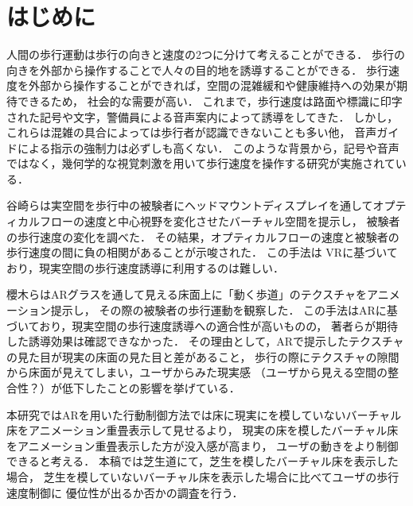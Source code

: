 \documentclass[dvipdfmx]{jsarticle}
\begin{document}

\vspace{3mm}

\section{はじめに}
人間の歩行運動は歩行の向きと速度の2つに分けて考えることができる．
歩行の向きを外部から操作することで人々の目的地を誘導することができる．
歩行速度を外部から操作することができれば，空間の混雑緩和や健康維持への効果が期待できるため，
社会的な需要が高い．
これまで，歩行速度は路面や標識に印字された記号や文字，警備員による音声案内によって誘導をしてきた．
しかし，これらは混雑の具合によっては歩行者が認識できないことも多い他，
音声ガイドによる指示の強制力は必ずしも高くない．
このような背景から，記号や音声ではなく，幾何学的な視覚刺激を用いて歩行速度を操作する研究が実施されている．

谷崎らは実空間を歩行中の被験者にヘッドマウントディスプレイを通してオプティカルフローの速度と中心視野を変化させたバーチャル空間を提示し，
被験者の歩行速度の変化を調べた\cite{article2}．
その結果，オプティカルフローの速度と被験者の歩行速度の間に負の相関があることが示唆された．
この手法は VRに基づいており，現実空間の歩行速度誘導に利用するのは難しい．


櫻木らはARグラスを通して見える床面上に「動く歩道」のテクスチャをアニメーション提示し，
その際の被験者の歩行運動を観察した\cite{article1}．
この手法はARに基づいており，現実空間の歩行速度誘導への適合性が高いものの，
著者らが期待した誘導効果は確認できなかった．
その理由として，ARで提示したテクスチャの見た目が現実の床面の見た目と差があること，
歩行の際にテクスチャの隙間から床面が見えてしまい，ユーザからみた現実感
（ユーザから見える空間の整合性？）が低下したことの影響を挙げている．

本研究ではARを用いた行動制御方法では床に現実にを模していないバーチャル床をアニメーション重畳表示して見せるより，
現実の床を模したバーチャル床をアニメーション重畳表示した方が没入感が高まり，
ユーザの動きをより制御できると考える．
本稿では芝生道にて，芝生を模したバーチャル床を表示した場合，
芝生を模していないバーチャル床を表示した場合に比べてユーザの歩行速度制御に
優位性が出るか否かの調査を行う．
\end{document}
